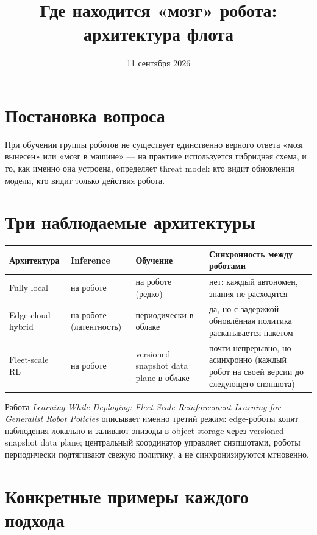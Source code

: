 \documentclass[11pt]{article}
\title{Где находится «мозг» робота: архитектура флота}
\author{}
\date{11 сентября 2026}
\begin{document}
\maketitle

\section{Постановка вопроса}

При обучении группы роботов не существует единственно верного ответа «мозг вынесен»
или «мозг в машине» — на практике используется гибридная схема, и то, как именно она
устроена, определяет threat model: кто видит обновления модели, кто видит только
действия робота.

\section{Три наблюдаемые архитектуры}

\begin{center}
\begin{tabular}{@{}p{3.2cm}p{3.6cm}p{3.6cm}p{4cm}@{}}
\toprule
Архитектура & Inference & Обучение & Синхронность между роботами \\
\midrule
Fully local & на роботе & на роботе (редко) & нет: каждый автономен, знания не
  расходятся \\
Edge-cloud hybrid & на роботе (латентность) & периодически в облаке & да, но с
  задержкой — обновлённая политика раскатывается пакетом \\
Fleet-scale RL \cite{fleetscale2026} & на роботе & versioned-snapshot data plane в
  облаке & почти-непрерывно, но асинхронно (каждый робот на своей версии до
  следующего снэпшота) \\
\bottomrule
\end{tabular}
\end{center}

Работа \emph{Learning While Deploying: Fleet-Scale Reinforcement Learning for
Generalist Robot Policies} \cite{fleetscale2026} описывает именно третий режим:
edge-роботы копят наблюдения локально и заливают эпизоды в object storage через
versioned-snapshot data plane; центральный координатор управляет снэпшотами, роботы
периодически подтягивают свежую политику, а не синхронизируются мгновенно.

\section{Конкретные примеры каждого подхода}
\end{document}
